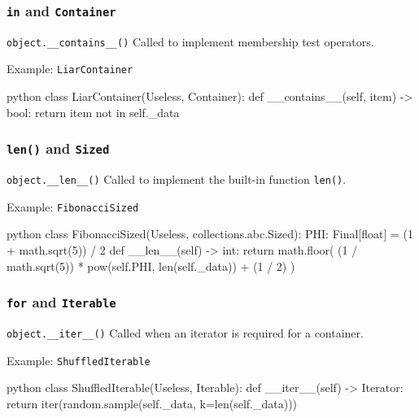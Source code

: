 \documentclass[aspectratio=169,dvipdfmx,12pt,notheorems]{beamer}
\theoremstyle{definition}
\begin{document}
\begin{frame}[fragile]\frametitle{\texttt{in} and \texttt{Container}}

\begin{block}{\texttt{object.\_\_contains\_\_()}}
Called to implement membership test operators.
\end{block}

\begin{exampleblock}{Example: \texttt{LiarContainer}}
\begin{pygments}{python}
class LiarContainer(Useless, Container):
    def __contains__(self, item) -> bool:
        return item not in self._data
\end{pygments}
\end{exampleblock}

\end{frame}

\begin{frame}[fragile]\frametitle{\texttt{len()} and \texttt{Sized}}

\begin{block}{\texttt{object.\_\_len\_\_()}}
Called to implement the built-in function \texttt{len()}.
\end{block}

\begin{exampleblock}{Example: \texttt{FibonacciSized}}
\begin{pygments}{python}
class FibonacciSized(Useless, collections.abc.Sized):
    PHI: Final[float] = (1 + math.sqrt(5)) / 2
    def __len__(self) -> int:
        return math.floor(
            (1 / math.sqrt(5)) * pow(self.PHI, len(self._data))
            + (1 / 2)
        )
\end{pygments}
\end{exampleblock}

\end{frame}

\begin{frame}[fragile]\frametitle{\texttt{for} and \texttt{Iterable}}

\begin{block}{\texttt{object.\_\_iter\_\_()}}
Called when an iterator is required for a container. 
\end{block}

\begin{exampleblock}{Example: \texttt{ShuffledIterable}}
\begin{pygments}{python}
class ShuffledIterable(Useless, Iterable):
    def __iter__(self) -> Iterator:
        return iter(random.sample(self._data, k=len(self._data)))
\end{pygments}
\end{exampleblock}

\end{frame}
\end{document}
